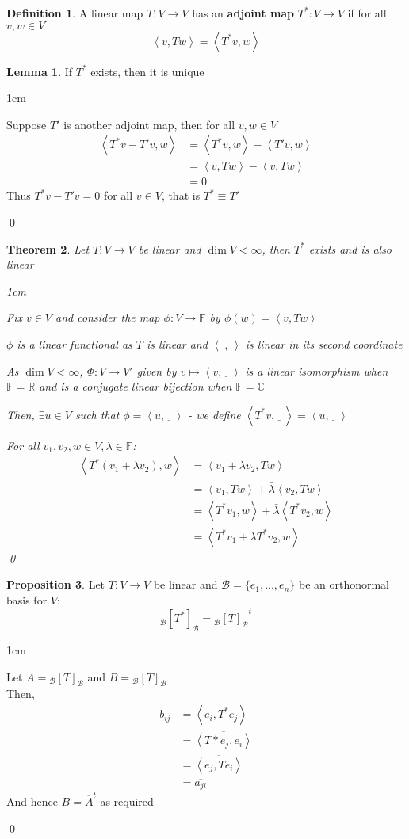 \documentclass[11pt, a4paper]{report}
\makeatletter
\numberwithin{equation}{section}
\newcommand{\R}{\mathbb{R}}
\newcommand{\B}{\mathcal{B}}
\newcommand{\C}{\mathbb{C}}
\newcommand{\F}{\mathbb{F}}
\newcommand{\blnk}{\underline{\;\;}\,}
\newcommand{\spn}[1]{\left\langle #1 \right\rangle}
\newcommand{\spb}{\spn{\;,\,}}
\numberwithin{equation}{subsection}
\theoremstyle{plain}
\newtheorem{thm}{Theorem}[chapter] %
\theoremstyle{definition}
\newtheorem{defn}{Definition}[chapter]
\newtheorem{lem}[thm]{Lemma}
\newtheorem{prop}[thm]{Proposition}
\theoremstyle{remark}
\newtheorem*{prf}{Proof}
\renewenvironment{prf}[1][\proofname]{\par
  \vspace{-\topsep}%
  \normalfont
  \topsep0pt \partopsep0pt %
  \trivlist
  \item[\hskip\labelsep
        \itshape
    #1\@addpunct{.}]\ignorespaces
}{%
  \popQED\endtrivlist\@endpefalse
  \addvspace{6pt plus 6pt} %
}
\newcommand{\pr}[1]{\begin{adjustwidth}{1cm}{} \begin{prf} #1 \end{prf} \end{adjustwidth}}
\makeatother
\begin{document}
\begin{defn}
A linear map $T: V \to V$ has an \textbf{adjoint map} $T^*: V \to V$ if for all $v,w \in V$
$$\spn{v, Tw} = \spn{T^*v, w}$$
\end{defn}

\begin{lem}
If $T^*$ exists, then it is unique
\pr{
Suppose $T'$ is another adjoint map, then for all $v,w \in V$
\begin{align*}
\spn{T^*v - T'v, w}	&= \spn{T^*v, w} - \spn{T'v, w}\\
					&= \spn{v, Tw} - \spn{v, Tw}\\
					&= 0
\end{align*}
Thus $T^*v - T'v = 0$ for all $v \in V$, that is $T^* \equiv T'$
}\qed
\end{lem}

\newpage

\begin{thm}
Let $T: V \to V$ be linear and $\dim V < \infty$, then $T^*$ exists and is also linear

\pr{
Fix $v \in V$ and consider the map $\phi: V \to \F$ by $\phi(w) = \spn{v, Tw}$

$\phi$ is a linear functional as $T$ is linear and $\spb$ is linear in its second coordinate

As $\dim V < \infty$, $\Phi: V \to V'$ given by $v \mapsto \spn{v, \blnk}$ is a linear isomorphism when $\F = \R$ and is a conjugate linear bijection when $\F = \C$

Then, $\exists u \in V$ such that $\phi = \spn{u, \blnk}$ - we define $\spn{T^*v, \blnk} = \spn{u, \blnk}$

For all $v_1, v_2, w \in V, \lambda \in \F$:
\begin{align*}
\spn{T^*(v_1 + \lambda v_2), w}	&= \spn{v_1 + \lambda v_2, Tw}\\
	&= \spn{v_1, Tw} + \bar{\lambda} \spn{v_2, Tw}\\
	&= \spn{T^*v_1, w} + \bar{\lambda} \spn{T^*v_2, w}\\
	&= \spn{T^*v_1 + \lambda T^*v_2, w}
\end{align*}\qed
}
\end{thm}

\begin{prop}
Let $T: V \to V$ be linear and $\B = \{ e_1, \ldots, e_n \}$ be an orthonormal basis for $V$:
$$_\B[T^*]_\B = {_\B\overline{[T]}_\B}^t$$

\pr{
Let $A = {_\B[T]_\B}$ and $B = {_\B[T]_\B}$\\ Then,
\begin{align*}
b_{ij}	&= \spn{e_i, T^*e_j}\\
		&= \overline{\spn{T*e_j, e_i}}\\
		&= \overline{\spn{e_j, Te_i}}\\
		&= \overline{a_{ji}}
\end{align*}
And hence $B = \overline{A}^t$ as required
}\qed

\end{prop}
\end{document}
